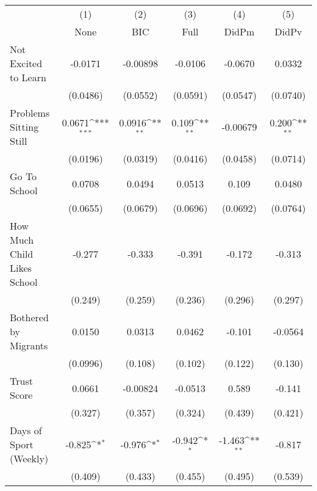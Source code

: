 {
\def\sym#1{\ifmmode^{#1}\else\(^{#1}\)\fi}
\begin{tabular}{l*{5}{c}}
\toprule
            &\multicolumn{1}{c}{(1)}&\multicolumn{1}{c}{(2)}&\multicolumn{1}{c}{(3)}&\multicolumn{1}{c}{(4)}&\multicolumn{1}{c}{(5)}\\
            &\multicolumn{1}{c}{None}&\multicolumn{1}{c}{BIC}&\multicolumn{1}{c}{Full}&\multicolumn{1}{c}{DidPm}&\multicolumn{1}{c}{DidPv}\\
\midrule
Not Excited to Learn&     -0.0171         &    -0.00898         &     -0.0106         &     -0.0670         &      0.0332         \\
            &    (0.0486)         &    (0.0552)         &    (0.0591)         &    (0.0547)         &    (0.0740)         \\
\addlinespace
Problems Sitting Still&      0.0671\sym{***}&      0.0916\sym{**} &       0.109\sym{**} &    -0.00679         &       0.200\sym{**} \\
            &    (0.0196)         &    (0.0319)         &    (0.0416)         &    (0.0458)         &    (0.0714)         \\
\addlinespace
Go To School&      0.0708         &      0.0494         &      0.0513         &       0.109         &      0.0480         \\
            &    (0.0655)         &    (0.0679)         &    (0.0696)         &    (0.0692)         &    (0.0764)         \\
\addlinespace
How Much Child Likes School&      -0.277         &      -0.333         &      -0.391         &      -0.172         &      -0.313         \\
            &     (0.249)         &     (0.259)         &     (0.236)         &     (0.296)         &     (0.297)         \\
\addlinespace
Bothered by Migrants&      0.0150         &      0.0313         &      0.0462         &      -0.101         &     -0.0564         \\
            &    (0.0996)         &     (0.108)         &     (0.102)         &     (0.122)         &     (0.130)         \\
\addlinespace
Trust Score &      0.0661         &    -0.00824         &     -0.0513         &       0.589         &      -0.141         \\
            &     (0.327)         &     (0.357)         &     (0.324)         &     (0.439)         &     (0.421)         \\
\addlinespace
Days of Sport (Weekly)&      -0.825\sym{*}  &      -0.976\sym{*}  &      -0.942\sym{*}  &      -1.463\sym{**} &      -0.817         \\
            &     (0.409)         &     (0.433)         &     (0.455)         &     (0.495)         &     (0.539)         \\
\bottomrule
\end{tabular}
}
